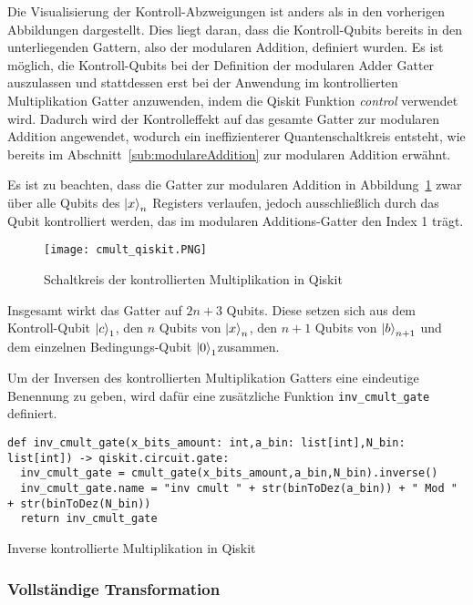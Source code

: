 Die Visualisierung der Kontroll-Abzweigungen ist anders als in den vorherigen Abbildungen dargestellt.
Dies liegt daran, dass die Kontroll-Qubits bereits in den unterliegenden Gattern, 
also der modularen Addition, 
definiert wurden.
Es ist möglich, die Kontroll-Qubits bei der Definition der modularen Adder Gatter auszulassen und 
stattdessen erst bei der Anwendung im kontrollierten Multiplikation Gatter anzuwenden, 
indem die Qiskit Funktion \textit{control} verwendet wird.
Dadurch wird der Kontrolleffekt auf das gesamte Gatter zur modularen Addition angewendet, 
wodurch ein ineffizienterer Quantenschaltkreis entsteht, 
wie bereits im Abschnitt~\ref{sub:modulareAddition} zur modularen Addition erwähnt.

Es ist zu beachten, dass die Gatter zur modularen Addition in Abbildung~\ref{fig:cmult_qiskit} zwar über 
alle Qubits des \(\ket{x}_n\) Registers verlaufen, 
jedoch ausschließlich durch das Qubit kontrolliert werden, 
das im modularen Additions-Gatter den Index 1 trägt.

\begin{figure} [H]
  \centering
  \texttt{[image: cmult\_qiskit.PNG]}
  \caption{Schaltkreis der kontrollierten Multiplikation in Qiskit}
  \label{fig:cmult_qiskit}
\end{figure}

Insgesamt wirkt das Gatter auf \(2n+3\) Qubits.
Diese setzen sich aus dem Kontroll-Qubit \(\ket{c}_1\), den \(n\) Qubits von \(\ket{x}_n\), 
den \(n+1\) Qubits von \(\ket{b}_{n+1}\) und dem einzelnen Bedingungs-Qubit \(\ket{0}_1\)zusammen.

Um der Inversen des kontrollierten Multiplikation Gatters eine eindeutige Benennung zu geben, 
wird dafür eine zusätzliche Funktion \texttt{inv\_cmult\_gate} definiert.
\begin{listing}[H]
\begin{verbatim}  
def inv_cmult_gate(x_bits_amount: int,a_bin: list[int],N_bin: list[int]) -> qiskit.circuit.gate:  
  inv_cmult_gate = cmult_gate(x_bits_amount,a_bin,N_bin).inverse()
  inv_cmult_gate.name = "inv cmult " + str(binToDez(a_bin)) + " Mod " + str(binToDez(N_bin))
  return inv_cmult_gate
  \end{verbatim}
  \caption{Inverse kontrollierte Multiplikation in Qiskit}
  \label{code:InverseModularMultiplication}
\end{listing}

\subsubsection{Vollständige Transformation}

